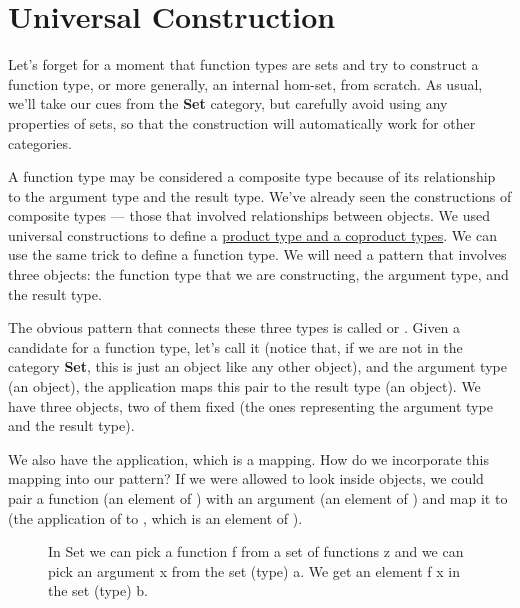 \section{Universal Construction}\label{universal-construction}

Let's forget for a moment that function types are sets and try to
construct a function type, or more generally, an internal hom-set, from
scratch. As usual, we'll take our cues from the \textbf{Set} category,
but carefully avoid using any properties of sets, so that the
construction will automatically work for other categories.

A function type may be considered a composite type because of its
relationship to the argument type and the result type. We've already
seen the constructions of composite types --- those that involved
relationships between objects. We used universal constructions to define
a \hyperref[products-and-coproducts]{product
type and a coproduct types}. We can use the same trick to define a
function type. We will need a pattern that involves three objects: the
function type that we are constructing, the argument type, and the
result type.

The obvious pattern that connects these three types is called
 or . Given a candidate for
a function type, let's call it  (notice that, if we are not in
the category \textbf{Set}, this is just an object like any other
object), and the argument type  (an object), the application
maps this pair to the result type  (an object). We have three
objects, two of them fixed (the ones representing the argument type and
the result type).

We also have the application, which is a mapping. How do we incorporate
this mapping into our pattern? If we were allowed to look inside
objects, we could pair a function  (an element of )
with an argument  (an element of ) and map it to
 (the application of  to , which is an
element of ).

\begin{figure}
\centering
{}
\caption{In Set we can pick a function f from a set of functions z and we can
pick an argument x from the set (type) a. We get an element f x in the
set (type) b.}
\end{figure}

